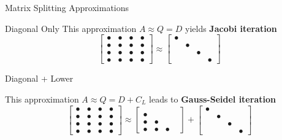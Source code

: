 \documentclass[10pt]{beamer}
\begin{document}

\begin{frame}{Matrix Splitting Approximations}


 \begin{block}{Diagonal Only}
     This approximation $A\approx Q = D$ yields \textbf{Jacobi iteration} 
    $$
        \begin{bmatrix}\bullet & \bullet & \bullet & \bullet  \\
                    \bullet & \bullet & \bullet & \bullet \\
                    \bullet & \bullet & \bullet & \bullet \\
                    \bullet & \bullet & \bullet & \bullet \end{bmatrix} \approx 
            \begin{bmatrix}
                \bullet & &  & \\
                 & \bullet & &  \\
                 &  & \bullet &  \\
                 &  &  & \bullet \end{bmatrix} 
    $$
 \end{block}

    \begin{block}{Diagonal + Lower}
        
  This approximation $A\approx Q = D+C_L$ leads to \textbf{Gauss-Seidel iteration}
        $$
        \begin{bmatrix}\bullet & \bullet & \bullet & \bullet  \\
                    \bullet & \bullet & \bullet & \bullet \\
                    \bullet & \bullet & \bullet & \bullet \\
                    \bullet & \bullet & \bullet & \bullet \end{bmatrix} \approx 
            \begin{bmatrix}
                 &  &  &  \\
                \bullet &  &  &  \\
                \bullet & \bullet &  &  \\
                \bullet & \bullet & \bullet &  \end{bmatrix} +
            \begin{bmatrix}
                \bullet & &  & \\
                 & \bullet & &  \\
                 &  & \bullet &  \\
                 &  &  & \bullet \end{bmatrix} 
    $$
    \end{block}

\end{frame}
\end{document}
